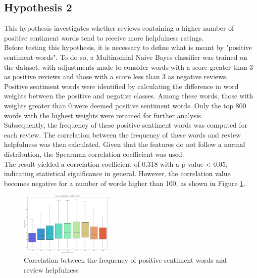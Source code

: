 \subsection*{Hypothesis 2}
This hypothesis investigates whether reviews containing a higher number of positive sentiment words
tend to receive more helpfulness ratings.\\
Before testing this hypothesis, it is necessary to define what is meant by "positive sentiment words".
To do so, a Multinomial Naive Bayes classifier was trained on the dataset,
with adjustments made to consider words with a score greater than 3 as positive reviews and those
with a score less than 3 as negative reviews. Positive sentiment words were identified by calculating
the difference in word weights between the positive and negative classes.
Among these words, those with weights greater than 0 were deemed positive sentiment words.
Only the top 800 words with the highest weights were retained for further analysis.\\
Subsequently, the frequency of these positive sentiment words was computed for each review.
The correlation between the frequency of these words and review helpfulness was then calculated.
Given that the features do not follow a normal distribution, the Spearman correlation coefficient was used.\\
The result yielded a correlation coefficient of 0.318 with a p-value < 0.05, indicating statistical significance in general.
However, the correlation value becomes negative for a number of words higher than 100, as shown in Figure \ref{fig:corr_pos_words}.

\begin{figure}[H]
    \centering
    \includegraphics[width=0.4\textwidth]{./figures/h2.png}
    \caption{Correlation between the frequency of positive sentiment words and review helpfulness}
    \label{fig:corr_pos_words}
\end{figure}
